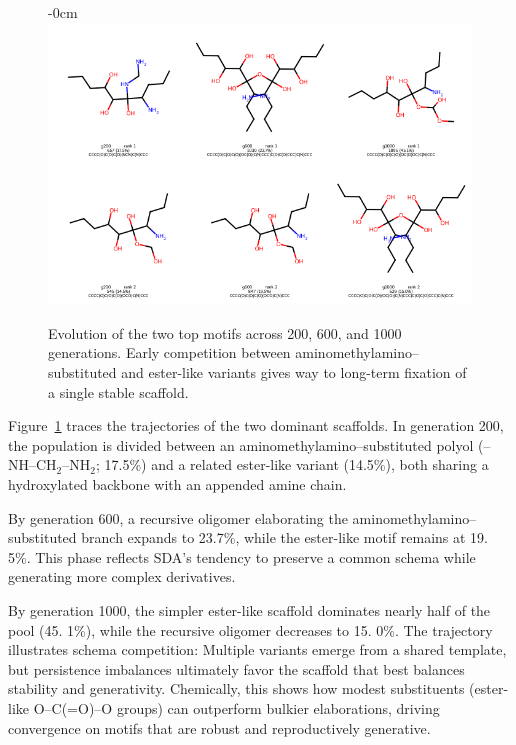 \documentclass[life,article,submit,pdftex,moreauthors]{Definitions/mdpi}
\begin{document}
\begin{figure}[H]
    \begin{adjustwidth}{-\extralength}{0cm}
    \centering
    \includegraphics[width=1\textwidth]{SDA-chem-top-evo.png}
    \end{adjustwidth}
    \caption{Evolution of the two top motifs across 200, 600, and 1000 generations. Early competition between aminomethylamino–substituted and ester-like variants gives way to long-term fixation of a single stable scaffold.}
    \label{fig:chem-top-evo}
\end{figure}

Figure~\ref{fig:chem-top-evo} traces the trajectories of the two dominant scaffolds.  
In generation 200, the population is divided between an aminomethylamino–substituted polyol (–NH–CH$_2$–NH$_2$; 17.5\%) and a related ester-like variant (14.5\%), both sharing a hydroxylated backbone with an appended amine chain.

By generation 600, a recursive oligomer elaborating the aminomethylamino–substituted branch expands to 23.7\%, while the ester-like motif remains at 19. 5\%. This phase reflects SDA’s tendency to preserve a common schema while generating more complex derivatives.  

By generation 1000, the simpler ester-like scaffold dominates nearly half of the pool (45. 1\%), while the recursive oligomer decreases to 15. 0\%. The trajectory illustrates schema competition: Multiple variants emerge from a shared template, but persistence imbalances ultimately favor the scaffold that best balances stability and generativity. Chemically, this shows how modest substituents (ester-like O–C(=O)–O groups) can outperform bulkier elaborations, driving convergence on motifs that are robust and reproductively generative.
\end{document}
